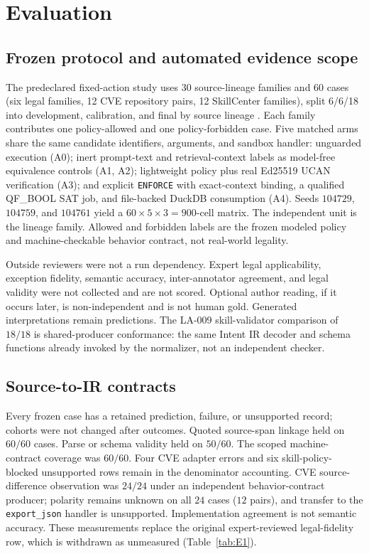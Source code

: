\section{Evaluation}
\label{sec:eval}

\subsection{Frozen protocol and automated evidence scope}
\label{sec:eval-protocol}

The predeclared fixed-action study uses 30 source-lineage families and 60 cases (six legal families, 12 CVE repository pairs, 12 SkillCenter families), split 6/6/18 into development, calibration, and final by source lineage \citep{cvefixes}. Each family contributes one policy-allowed and one policy-forbidden case. Five matched arms share the same candidate identifiers, arguments, and sandbox handler: unguarded execution (A0); inert prompt-text and retrieval-context labels as model-free equivalence controls (A1, A2); lightweight policy plus real Ed25519 UCAN verification (A3); and explicit \texttt{ENFORCE} with exact-context binding, a qualified QF\_BOOL SAT job, and file-backed DuckDB consumption (A4). Seeds $104729$, $104759$, and $104761$ yield a $60\times 5\times 3=900$-cell matrix. The independent unit is the lineage family. Allowed and forbidden labels are the frozen modeled policy and machine-checkable behavior contract, not real-world legality.

Outside reviewers were not a run dependency. Expert legal applicability, exception fidelity, semantic accuracy, inter-annotator agreement, and legal validity were not collected and are not scored. Optional author reading, if it occurs later, is non-independent and is not human gold. Generated interpretations remain predictions. The LA-009 skill-validator comparison of $18/18$ is shared-producer conformance: the same Intent IR decoder and schema functions already invoked by the normalizer, not an independent checker.

\subsection{Source-to-IR contracts}
\label{sec:eval-source}

Every frozen case has a retained prediction, failure, or unsupported record; cohorts were not changed after outcomes. Quoted source-span linkage held on $60/60$ cases. Parse or schema validity held on $50/60$. The scoped machine-contract coverage was $60/60$. Four CVE adapter errors and six skill-policy-blocked unsupported rows remain in the denominator accounting. CVE source-difference observation was $24/24$ under an independent behavior-contract producer; polarity remains unknown on all $24$ cases ($12$ pairs), and transfer to the \texttt{export\_json} handler is unsupported. Implementation agreement is not semantic accuracy. These measurements replace the original expert-reviewed legal-fidelity row, which is withdrawn as unmeasured (Table~\ref{tab:E1}).

